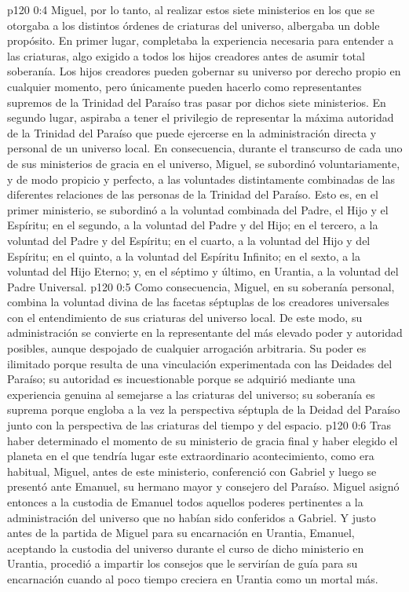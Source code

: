 \vs p120 0:4 Miguel, por lo tanto, al realizar estos siete ministerios en los que se otorgaba a los distintos órdenes de criaturas del universo, albergaba un doble propósito. En primer lugar, completaba la experiencia necesaria para entender a las criaturas, algo exigido a todos los hijos creadores antes de asumir total soberanía. Los hijos creadores pueden gobernar su universo por derecho propio en cualquier momento, pero únicamente pueden hacerlo como representantes supremos de la Trinidad del Paraíso tras pasar por dichos siete ministerios. En segundo lugar, aspiraba a tener el privilegio de representar la máxima autoridad de la Trinidad del Paraíso que puede ejercerse en la administración directa y personal de un universo local. En consecuencia, durante el transcurso de cada uno de sus ministerios de gracia en el universo, Miguel, se subordinó voluntariamente, y de modo propicio y perfecto, a las voluntades distintamente combinadas de las diferentes relaciones de las personas de la Trinidad del Paraíso. Esto es, en el primer ministerio, se subordinó a la voluntad combinada del Padre, el Hijo y el Espíritu; en el segundo, a la voluntad del Padre y del Hijo; en el tercero, a la voluntad del Padre y del Espíritu; en el cuarto, a la voluntad del Hijo y del Espíritu; en el quinto, a la voluntad del Espíritu Infinito; en el sexto, a la voluntad del Hijo Eterno; y, en el séptimo y último, en Urantia, a la voluntad del Padre Universal.
\vs p120 0:5 Como consecuencia, Miguel, en su soberanía personal, combina la voluntad divina de las facetas séptuplas de los creadores universales con el entendimiento de sus criaturas del universo local. De este modo, su administración se convierte en la representante del más elevado poder y autoridad posibles, aunque despojado de cualquier arrogación arbitraria. Su poder es ilimitado porque resulta de una vinculación experimentada con las Deidades del Paraíso; su autoridad es incuestionable porque se adquirió mediante una experiencia genuina al semejarse a las criaturas del universo; su soberanía es suprema porque engloba a la vez la perspectiva séptupla de la Deidad del Paraíso junto con la perspectiva de las criaturas del tiempo y del espacio.
\vs p120 0:6 \pc Tras haber determinado el momento de su ministerio de gracia final y haber elegido el planeta en el que tendría lugar este extraordinario acontecimiento, como era habitual, Miguel, antes de este ministerio, conferenció con Gabriel y luego se presentó ante Emanuel, su hermano mayor y consejero del Paraíso. Miguel asignó entonces a la custodia de Emanuel todos aquellos poderes pertinentes a la administración del universo que no habían sido conferidos a Gabriel. Y justo antes de la partida de Miguel para su encarnación en Urantia, Emanuel, aceptando la custodia del universo durante el curso de dicho ministerio en Urantia, procedió a impartir los consejos que le servirían de guía para su encarnación cuando al poco tiempo creciera en Urantia como un mortal más.

